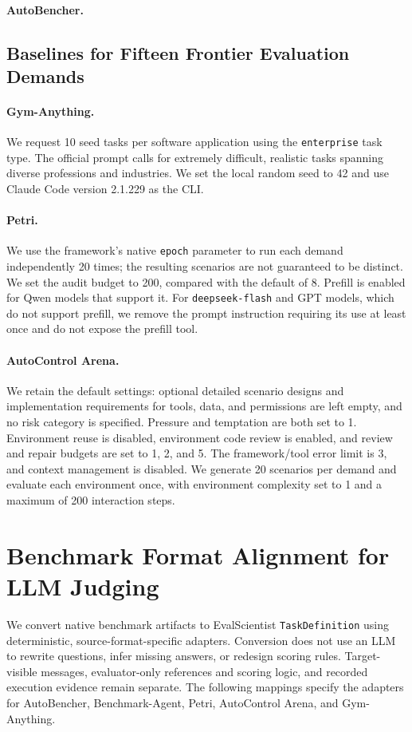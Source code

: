 \documentclass{article} %
\begin{document}
	\paragraph{AutoBencher.}

	\subsection{Baselines for Fifteen Frontier Evaluation Demands}
	\paragraph{Gym-Anything.}
	We request 10 seed tasks per software application using the \texttt{enterprise}
	task type. The official prompt calls for extremely difficult, realistic tasks
	spanning diverse professions and industries. We set the local random seed to
	42 and use Claude Code version 2.1.229 as the CLI.

	\paragraph{Petri.}
	We use the framework's native \texttt{epoch} parameter to run each demand
	independently 20 times; the resulting scenarios are not guaranteed to be
	distinct. We set the audit budget to 200, compared with the default of 8.
	Prefill is enabled for Qwen models that support it. For \texttt{deepseek-flash}
	and GPT models, which do not support prefill, we remove the prompt instruction
	requiring its use at least once and do not expose the prefill tool.

	\paragraph{AutoControl Arena.}
	We retain the default settings: optional detailed scenario designs and
	implementation requirements for tools, data, and permissions are left empty,
	and no risk category is specified. Pressure and temptation are both set to 1.
	Environment reuse is disabled, environment code review is enabled, and review
	and repair budgets are set to 1, 2, and 5. The framework/tool error limit is 3,
	and context management is disabled. We generate 20 scenarios per demand and
	evaluate each environment once, with environment complexity set to 1 and a
	maximum of 200 interaction steps.

	\section{Benchmark Format Alignment for LLM Judging}
	\label{app:format-alignment}
	We convert native benchmark artifacts to EvalScientist \texttt{TaskDefinition}
	using deterministic, source-format-specific adapters. Conversion does not
	use an LLM to rewrite questions, infer missing answers, or redesign scoring
	rules. Target-visible messages, evaluator-only references and scoring logic,
	and recorded execution evidence remain separate. The following mappings
	specify the adapters for AutoBencher, Benchmark-Agent, Petri, AutoControl Arena,
	and Gym-Anything.
\end{document}
